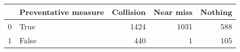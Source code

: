 \begin{tabular}{llrrr}
\toprule
{} &  Preventative measure &  Collision &  Near miss &  Nothing \\
\midrule
0 &                  True &       1424 &       1031 &      588 \\
1 &                 False &        440 &          1 &      105 \\
\bottomrule
\end{tabular}
